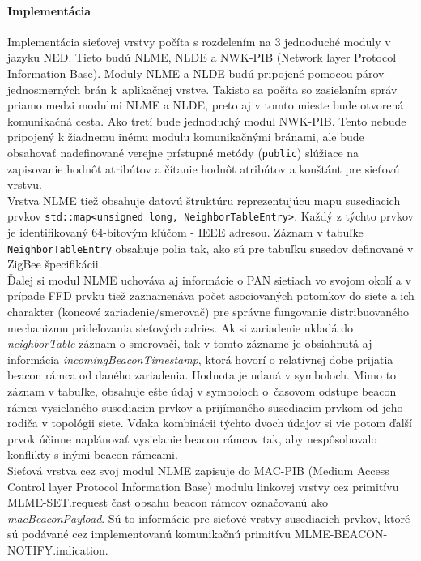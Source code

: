 \paragraph{Implementácia}
Implementácia sieťovej vrstvy počíta s rozdelením na 3 jednoduché moduly v jazyku NED. Tieto budú NLME, NLDE a NWK-PIB (Network layer Protocol Information Base). Moduly NLME a NLDE budú pripojené pomocou párov jednosmerných brán k~aplikačnej vrstve. Takisto sa počíta so zasielaním správ priamo medzi modulmi NLME a NLDE, preto aj v tomto mieste bude otvorená komunikačná cesta. Ako tretí bude jednoduchý modul NWK-PIB. Tento nebude pripojený k žiadnemu inému modulu komunikačnými bránami, ale bude obsahovať nadefinované verejne prístupné metódy (\texttt{public}) slúžiace na zapisovanie hodnôt atribútov a čítanie hodnôt atribútov a konštánt pre sieťovú vrstvu.\\
\indent Vrstva NLME tiež obsahuje datovú štruktúru reprezentujúcu mapu susediacich prvkov \texttt{std::map<unsigned long, NeighborTableEntry>}. Každý z týchto prvkov je identifikovaný 64-bitovým kľúčom - IEEE adresou. Záznam v tabuľke \texttt{NeighborTableEntry} obsahuje polia tak, ako sú pre tabuľku susedov definované v ZigBee špecifikácii.\\
\indent Ďalej si modul NLME uchováva aj informácie o PAN sietiach vo svojom okolí a v prípade FFD prvku tiež zaznamenáva počet asociovaných potomkov do siete a ich charakter (koncové zariadenie/smerovač) pre správne fungovanie distribuovaného mechanizmu prideľovania sieťových adries. Ak si zariadenie ukladá do \textit{neighborTable} záznam o smerovači, tak v tomto zázname je obsiahnutá aj informácia \textit{incomingBeaconTimestamp}, ktorá hovorí o relatívnej dobe prijatia beacon rámca od daného zariadenia. Hodnota je udaná v symboloch. Mimo to záznam v tabuľke, obsahuje ešte údaj v symboloch o~časovom odstupe beacon rámca vysielaného susediacim prvkov a prijímaného susediacim prvkom od jeho rodiča v topológii siete. Vďaka kombinácii týchto dvoch údajov si vie potom ďalší prvok účinne naplánovať vysielanie beacon rámcov tak, aby nespôsobovalo konflikty s inými beacon rámcami.\\
\indent Sieťová vrstva cez svoj modul NLME zapisuje do MAC-PIB (Medium Access Control layer Protocol Information Base) modulu linkovej vrstvy cez primitívu MLME-SET.request časť obsahu beacon rámcov označovanú ako \textit{macBeaconPayload}. Sú to informácie pre sieťové vrstvy susediacich prvkov, ktoré sú podávané cez implementovanú komunikačnú primitívu MLME-BEACON-NOTIFY.indication.\\
